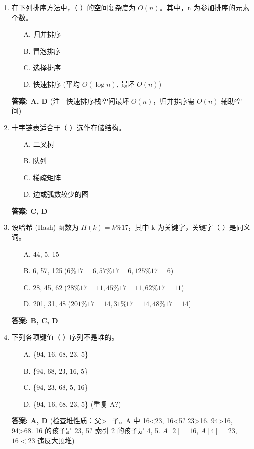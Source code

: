 \documentclass[12pt, a4paper]{article}
\begin{document}
\begin{enumerate}
    \item 在下列排序方法中，（ ）的空间复杂度为 $O(n)$。其中，n 为参加排序的元素个数。
    \begin{enumerate}
        \item[A.] 归并排序
        \item[B.] 冒泡排序
        \item[C.] 选择排序
        \item[D.] 快速排序 (平均 $O(\log n)$, 最坏 $O(n)$)
    \end{enumerate}
    \textbf{答案: A, D} (注：快速排序栈空间最坏 $O(n)$，归并排序需 $O(n)$ 辅助空间)

    \item 十字链表适合于（ ）选作存储结构。
    \begin{enumerate}
        \item[A.] 二叉树
        \item[B.] 队列
        \item[C.] 稀疏矩阵
        \item[D.] 边或弧数较少的图
    \end{enumerate}
    \textbf{答案: C, D}

    \item 设哈希 (Hash) 函数为 $H(k)= k \% 17$，其中 k 为关键字，关键字（ ）是同义词。
    \begin{enumerate}
        \item[A.] 44, 5, 15
        \item[B.] 6, 57, 125 ($6\%17=6, 57\%17=6, 125\%17=6$)
        \item[C.] 28, 45, 62 ($28\%17=11, 45\%17=11, 62\%17=11$)
        \item[D.] 201, 31, 48 ($201\%17=14, 31\%17=14, 48\%17=14$)
    \end{enumerate}
    \textbf{答案: B, C, D}

    \item 下列各项键值（ ）序列不是堆的。
    \begin{enumerate}
        \item[A.] \{94, 16, 68, 23, 5\}
        \item[B.] \{94, 68, 23, 16, 5\}
        \item[C.] \{94, 23, 68, 5, 16\}
        \item[D.] \{94, 16, 68, 23, 5\} (重复 A?)
    \end{enumerate}
    \textbf{答案: A, D} (检查堆性质：父>=子。A 中 16<23, 16<5? 23>16. 94>16, 94>68. 16 的孩子是 23, 5? 索引 2 的孩子是 4, 5. $A[2]=16$, $A[4]=23$, $16<23$ 违反大顶堆)


\end{enumerate}
\end{document}
